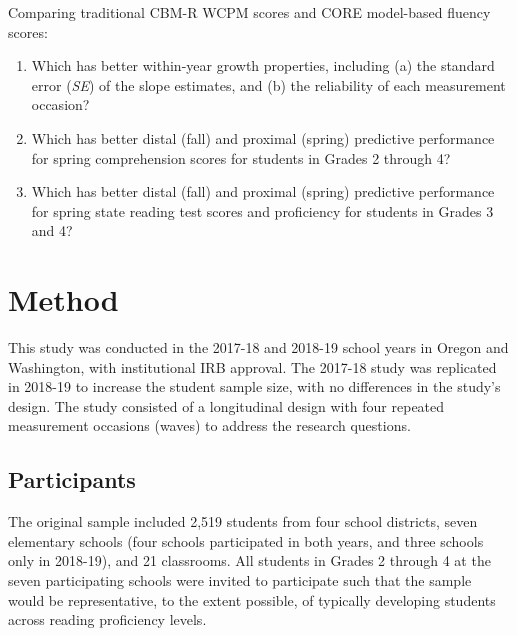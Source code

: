 \documentclass[
  english,
  man, fleqn, noextraspace]{apa6}
\begin{document}
Comparing traditional CBM-R WCPM scores and CORE model-based fluency scores:

\begin{enumerate}
\def\labelenumi{(\arabic{enumi})}
\item
  Which has better within-year growth properties, including (a) the standard error (\emph{SE}) of the slope estimates, and (b) the reliability of each measurement occasion?
\item
  Which has better distal (fall) and proximal (spring) predictive performance for spring comprehension scores for students in Grades 2 through 4?
\item
  Which has better distal (fall) and proximal (spring) predictive performance for spring state reading test scores and proficiency for students in Grades 3 and 4?
\end{enumerate}

\hypertarget{method}{%
\section{Method}\label{method}}

This study was conducted in the 2017-18 and 2018-19 school years in Oregon and Washington, with institutional IRB approval. The 2017-18 study was replicated in 2018-19 to increase the student sample size, with no differences in the study's design. The study consisted of a longitudinal design with four repeated measurement occasions (waves) to address the research questions.

\hypertarget{participants}{%
\subsection{Participants}\label{participants}}

The original sample included 2,519 students from four school districts, seven elementary schools (four schools participated in both years, and three schools only in 2018-19), and 21 classrooms. All students in Grades 2 through 4 at the seven participating schools were invited to participate such that the sample would be representative, to the extent possible, of typically developing students across reading proficiency levels.
\end{document}

